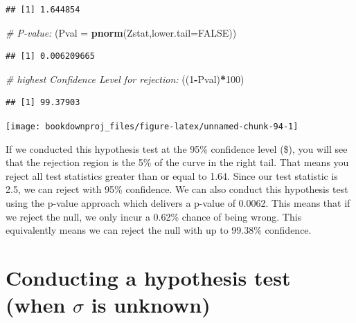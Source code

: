 \documentclass[
]{book}
\newenvironment{Shaded}{\begin{snugshade}}{\end{snugshade}}
\newcommand{\AttributeTok}[1]{\textcolor[rgb]{0.13,0.29,0.53}{#1}}
\newcommand{\CommentTok}[1]{\textcolor[rgb]{0.56,0.35,0.01}{\textit{#1}}}
\newcommand{\ConstantTok}[1]{\textcolor[rgb]{0.56,0.35,0.01}{#1}}
\newcommand{\DecValTok}[1]{\textcolor[rgb]{0.00,0.00,0.81}{#1}}
\newcommand{\FunctionTok}[1]{\textcolor[rgb]{0.13,0.29,0.53}{\textbf{#1}}}
\newcommand{\NormalTok}[1]{#1}
\newcommand{\SpecialCharTok}[1]{\textcolor[rgb]{0.81,0.36,0.00}{\textbf{#1}}}
\begin{document}
\begin{verbatim}
## [1] 1.644854
\end{verbatim}

\begin{Shaded}
\begin{Highlighting}[]
\CommentTok{\# P{-}value:}
\NormalTok{(}\AttributeTok{Pval =} \FunctionTok{pnorm}\NormalTok{(Zstat,}\AttributeTok{lower.tail=}\ConstantTok{FALSE}\NormalTok{))}
\end{Highlighting}
\end{Shaded}

\begin{verbatim}
## [1] 0.006209665
\end{verbatim}

\begin{Shaded}
\begin{Highlighting}[]
\CommentTok{\# highest Confidence Level for rejection:}
\NormalTok{((}\DecValTok{1}\SpecialCharTok{{-}}\NormalTok{Pval)}\SpecialCharTok{*}\DecValTok{100}\NormalTok{)}
\end{Highlighting}
\end{Shaded}

\begin{verbatim}
## [1] 99.37903
\end{verbatim}

\begin{center}\texttt{[image: bookdownproj\_files/figure-latex/unnamed-chunk-94-1]} \end{center}

If we conducted this hypothesis test at the 95\% confidence level (\$), you will see that the rejection region is the 5\% of the curve in the right tail. That means you reject all test statistics greater than or equal to 1.64. Since our test statistic is 2.5, we can reject with 95\% confidence. We can also conduct this hypothesis test using the p-value approach which delivers a p-value of 0.0062. This means that if we reject the null, we only incur a 0.62\% chance of being wrong. This equivalently means we can reject the null with up to 99.38\% confidence.

\section{\texorpdfstring{Conducting a hypothesis test (when \(\sigma\) is unknown)}{Conducting a hypothesis test (when \textbackslash sigma is unknown)}}\label{conducting-a-hypothesis-test-when-sigma-is-unknown}
\end{document}
